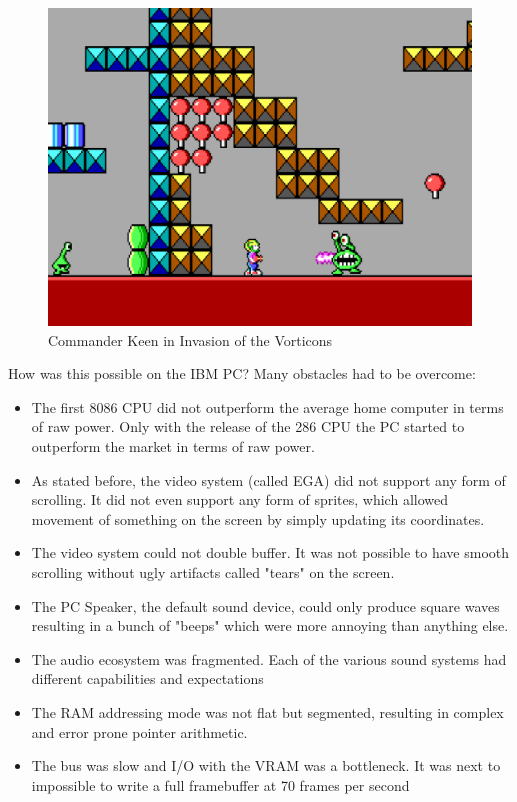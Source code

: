 \documentclass[book.tex]{subfiles}
\begin{document}
\begin{figure}[H]
  \centering
 \includegraphics[width=1.0\textwidth]{screenshots_300dpi/Keen_Verticons.png}
\caption{Commander Keen in Invasion of the Vorticons}
\end{figure}

\par
\vspace{10pt}
How was this possible on the IBM PC? Many obstacles had to be overcome:
\begin{itemize}
  \item The first 8086 CPU did not outperform the average home computer in terms of raw power. Only with the release of the 286 CPU the PC started to outperform the market in terms of raw power.
  \item As stated before, the video system (called EGA) did not support any form of scrolling. It did not even support any form of sprites, which allowed movement of something on the screen by simply updating its  coordinates.
  \item The video system could not double buffer. It was not possible to have smooth scrolling without ugly artifacts called "tears" on the screen.
  \item The PC Speaker, the default sound device, could only produce square waves resulting in a bunch of "beeps" which were more annoying than anything else.
  \item The audio ecosystem was fragmented. Each of the various sound systems had
different capabilities and expectations
  \item The RAM addressing mode was not flat but segmented, resulting in complex and
error prone pointer arithmetic.
  \item The bus was slow and I/O with the VRAM was a bottleneck. It was next to impossible to write a full framebuffer at 70 frames per second
\end{itemize}
\par
\end{document}

